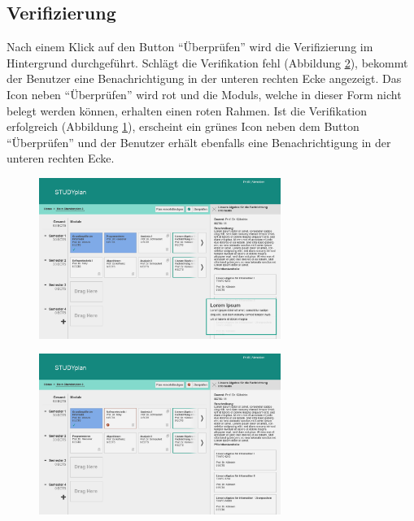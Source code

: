 \subsection{Verifizierung}
\label{subsec:gui-verifizierung}
Nach einem Klick auf den Button \enquote{Überprüfen} wird die Verifizierung im Hintergrund durchgeführt.\newline
Schlägt die Verifikation fehl (Abbildung \ref{fig:gui-verifizierung-2}), bekommt der \gls{Benutzer} eine Benachrichtigung in der unteren rechten Ecke angezeigt. Das Icon neben \enquote{Überprüfen} wird rot und die \glspl{Modul}, welche in dieser Form nicht belegt werden können, erhalten einen roten Rahmen.\newline
Ist die Verifikation erfolgreich (Abbildung \ref{fig:gui-verifizierung-1}), erscheint ein grünes Icon neben dem Button \enquote{Überprüfen} und der \gls{Benutzer} erhält ebenfalls eine Benachrichtigung in der unteren rechten Ecke.
\begin{figure}[!htb]
	\caption{}
	\label{fig:gui-verifizierung-1}
	\centering
	\includegraphics[width=0.7\textwidth]{../GUI/ergebnisse/verifizierung-1.png}
\end{figure}
\begin{figure}[!htb]
	\caption{}
	\label{fig:gui-verifizierung-2}
	\centering
	\includegraphics[width=0.7\textwidth]{../GUI/ergebnisse/verifizierung-2.png}
\end{figure}

